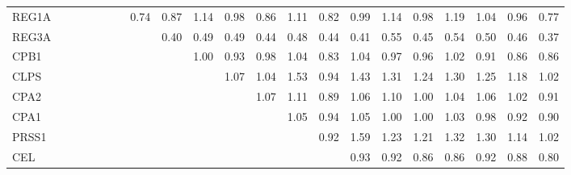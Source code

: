 \begin{longtable}{lrrrrrrrrrrrrrrrrrrrr}
REG1A    &              &              &              &             &             &             &        0.74 &       0.87 &       1.14 &       0.98 &       0.86 &        1.11 &      0.82 &        0.99 &           1.14 &          0.98 &      1.19 &        1.04 &        0.96 &       0.77 \\
REG3A    &              &              &              &             &             &             &             &       0.40 &       0.49 &       0.49 &       0.44 &        0.48 &      0.44 &        0.41 &           0.55 &          0.45 &      0.54 &        0.50 &        0.46 &       0.37 \\
CPB1     &              &              &              &             &             &             &             &            &       1.00 &       0.93 &       0.98 &        1.04 &      0.83 &        1.04 &           0.97 &          0.96 &      1.02 &        0.91 &        0.86 &       0.86 \\
CLPS     &              &              &              &             &             &             &             &            &            &       1.07 &       1.04 &        1.53 &      0.94 &        1.43 &           1.31 &          1.24 &      1.30 &        1.25 &        1.18 &       1.02 \\
CPA2     &              &              &              &             &             &             &             &            &            &            &       1.07 &        1.11 &      0.89 &        1.06 &           1.10 &          1.00 &      1.04 &        1.06 &        1.02 &       0.91 \\
CPA1     &              &              &              &             &             &             &             &            &            &            &            &        1.05 &      0.94 &        1.05 &           1.00 &          1.00 &      1.03 &        0.98 &        0.92 &       0.90 \\
PRSS1    &              &              &              &             &             &             &             &            &            &            &            &             &      0.92 &        1.59 &           1.23 &          1.21 &      1.32 &        1.30 &        1.14 &       1.02 \\
CEL      &              &              &              &             &             &             &             &            &            &            &            &             &           &        0.93 &           0.92 &          0.86 &      0.86 &        0.92 &        0.88 &       0.80 \\

\end{longtable}
